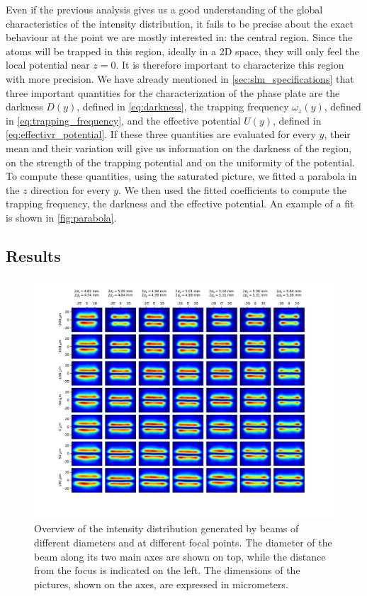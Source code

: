 Even if the previous analysis gives us a good understanding of the global characteristics of the intensity distribution, it fails to be precise about the exact behaviour at the point we are mostly interested in: the central region. Since the atoms will be trapped in this region, ideally in a 2D space, they will only feel the local potential near $z=0$. It is therefore important to characterize this region with more precision.
We have already mentioned in \cref{sec:slm_specifications} that three important quantities for the characterization of the phase plate are the darkness $D(y)$, defined in \cref{eq:darkness}, the trapping frequency $\omega_z(y)$, defined in \cref{eq:trapping_frequency}, and the effective potential $U(y)$, defined in \cref{eq:effectivr_potential}. If these three quantities are evaluated for every $y$, their mean and their variation will give us information on the darkness of the region, on the strength of the trapping potential and on the uniformity of the potential.
To compute these quantities, using the saturated picture, we fitted a parabola in the $z$ direction for every $y$. We then used the fitted coefficients to compute the trapping frequency, the darkness and the effective potential. An example of a fit is shown in \cref{fig:parabola}.

\subsection{Results}

\begin{figure}
    \centering
    \includegraphics[width=1.3\textwidth, center]{chapters/chapter_3/figures/grid.pdf}
    \caption{Overview of the intensity distribution generated by beams of different diameters and at different focal points. The diameter of the beam along its two main axes are shown on top, while the distance from the focus is indicated on the left. The dimensions of the pictures, shown on the axes, are expressed in micrometers.}
    \label{fig:grid}
\end{figure}

